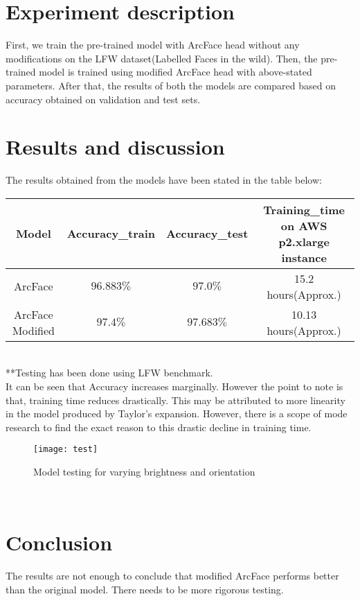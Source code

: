 \section{Experiment description}
First, we train the pre-trained model with ArcFace head without any modifications on the LFW dataset(Labelled Faces in the wild). Then, the pre-trained model is trained using modified ArcFace head with above-stated parameters. After that, the results of both the models are compared based on accuracy obtained on validation and test sets.
\section{Results and discussion}
The results obtained from the models have been stated in the table below:
\begin{center}
\begin{tabular}{ |c|c|c|c| } 
\hline
Model & Accuracy\_train & Accuracy\_test & Training\_time on AWS p2.xlarge instance \\
\hline
ArcFace & $96.883\%$ & $97.0\%$ & 15.2 hours(Approx.) \\ 
\hline
ArcFace Modified & $97.4\%$ & $97.683\%$ & 10.13 hours(Approx.) \\ 
\hline
\end{tabular}
\end{center}\\
**Testing has been done using LFW benchmark.\\
It can be seen that Accuracy increases marginally. However the point to note is that, training time reduces drastically. This may be attributed to more linearity in the model produced by Taylor's expansion. However, there is a scope of mode research to find the exact reason to this drastic decline in training time.
\\
\begin{figure}[!h]
    		\centering
    		\texttt{[image: test]}
    		\caption{Model testing for varying brightness and orientation}
\end{figure}\\

\section{Conclusion}
The results are not enough to conclude that modified ArcFace performs better than the original model. There needs to be more rigorous testing. 